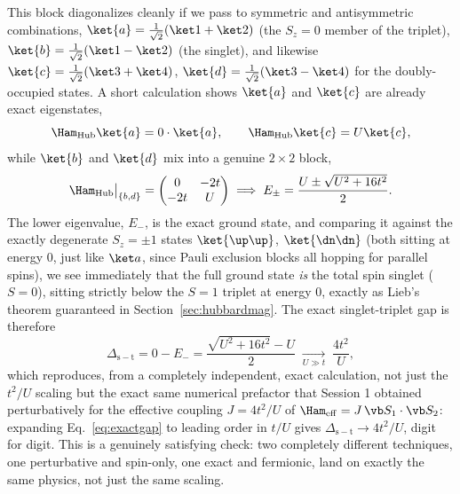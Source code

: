 \documentclass[all_sessions.tex]{subfiles}
\begin{document}
This block diagonalizes cleanly if we pass to symmetric and antisymmetric combinations,
$\ket{a}=\tfrac1{\sqrt2}(\ket1+\ket2)$ (the $S_z=0$ member of the triplet), $\ket{b}=
\tfrac1{\sqrt2}(\ket1-\ket2)$ (the singlet), and likewise $\ket{c}=\tfrac1{\sqrt2}(\ket3+\ket4)$,
$\ket{d}=\tfrac1{\sqrt2}(\ket3-\ket4)$ for the doubly-occupied states. A short calculation shows
$\ket{a}$ and $\ket{c}$ are already exact eigenstates,
\begin{equation}
  \Ham_{\mathrm{Hub}}\ket{a} = 0\cdot\ket{a}, \qquad \Ham_{\mathrm{Hub}}\ket{c} = U\ket{c},
\end{equation}
while $\ket{b}$ and $\ket{d}$ mix into a genuine $2\times2$ block,
\begin{equation}
  \Ham_{\mathrm{Hub}}\big|_{\{b,d\}} = \begin{pmatrix} 0 & -2t \\ -2t & U\end{pmatrix}
  \;\Longrightarrow\;
  E_\pm = \frac{U \pm \sqrt{U^2 + 16t^2}}2.
\end{equation}
The lower eigenvalue, $E_-$, is the exact ground state, and comparing it against the exactly
degenerate $S_z=\pm1$ states $\ket{\up\up}$, $\ket{\dn\dn}$ (both sitting at energy $0$, just like
$\ket a$, since Pauli exclusion blocks all hopping for parallel spins), we see immediately that the
full ground state \emph{is} the total spin singlet ($S=0$), sitting strictly below the $S=1$
triplet at energy $0$, exactly as Lieb's theorem guaranteed in Section~\ref{sec:hubbardmag}. The
exact singlet-triplet gap is therefore
\begin{equation}
  \Delta_{\mathrm{s-t}} = 0 - E_- = \frac{\sqrt{U^2+16t^2} - U}{2}
  \;\xrightarrow[U\gg t]{}\; \frac{4t^2}{U},
  \label{eq:exactgap}
\end{equation}
which reproduces, from a completely independent, exact calculation, not just the $t^2/U$ scaling
but the exact same numerical prefactor that Session 1 obtained perturbatively for the effective
coupling $J=4t^2/U$ of $\Ham_{\mathrm{eff}} = J\,\vb S_1\cdot\vb S_2$: expanding
Eq.~\eqref{eq:exactgap} to leading order in $t/U$ gives $\Delta_{\mathrm{s-t}}\to4t^2/U$, digit for
digit. This is a genuinely satisfying check: two completely different techniques, one perturbative
and spin-only, one exact and fermionic, land on exactly the same physics, not just the same scaling.
\end{document}

